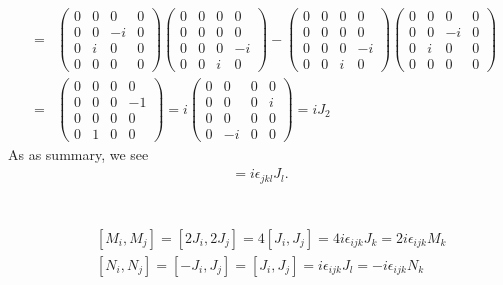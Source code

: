 \documentclass[11pt]{article}
\begin{document}
\begin{eqnarray}
    [J_3,J_1]&=&
    \begin{pmatrix}
        0 & 0 & 0 & 0 \\
        0 & 0 & -i & 0 \\
        0 & i & 0 & 0 \\
        0 & 0 & 0 & 0 
    \end{pmatrix}
    \begin{pmatrix}
        0 & 0 & 0 & 0\\
        0 & 0 & 0 & 0 \\
        0 & 0 & 0 & -i \\
        0 & 0 & i & 0
    \end{pmatrix}
    -
    \begin{pmatrix}
        0 & 0 & 0 & 0\\
        0 & 0 & 0 & 0 \\
        0 & 0 & 0 & -i \\
        0 & 0 & i & 0
    \end{pmatrix}
    \begin{pmatrix}
        0 & 0 & 0 & 0 \\
        0 & 0 & -i & 0 \\
        0 & i & 0 & 0 \\
        0 & 0 & 0 & 0 
    \end{pmatrix}\\ 
    &=& 
    \begin{pmatrix}
        0 & 0 & 0 & 0 \\
        0 & 0 & 0 & -1 \\
        0 & 0 & 0 & 0 \\
        0 & 1 & 0 & 0 
    \end{pmatrix}
    =i
    \begin{pmatrix}
        0 & 0 & 0 & 0 \\
        0 & 0 & 0 & i \\
        0 & 0 & 0 & 0 \\
        0 & -i & 0 & 0 
    \end{pmatrix}
    =iJ_2
\end{eqnarray}
As as summary, we see 
\begin{eqnarray}
    [ J_j, J_k ] = i\epsilon_{jkl} J_l .
  \end{eqnarray}

\section{ }
\begin{eqnarray}
    &&[M_i,M_j]=[2J_i,2J_j]=4[J_i,J_j]=4i\epsilon_{ijk}J_k=2i\epsilon_{ijk}M_k \\
    &&[N_i,N_j]=[-J_i,J_j]=[J_i,J_j]=i\epsilon_{ijk}J_l=-i\epsilon_{ijk}N_k
\end{eqnarray}
\end{document}

